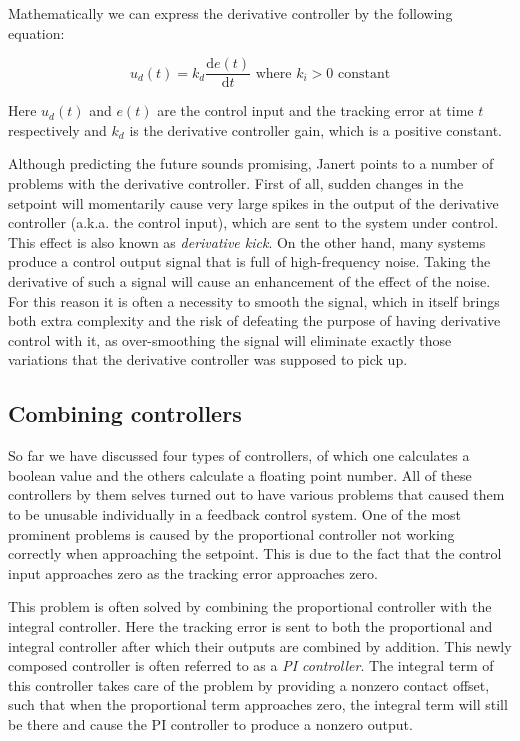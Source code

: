 Mathematically we can express the derivative controller by the following equation:

\begin{equation}\label{eq:derivative-control}
u_d(t) = k_d \frac{\mathrm{d} e(t)}{\mathrm{d} t} \text{\ \ \ \ where } k_i > 0 \text{ constant}
\end{equation}

Here $u_d(t)$ and $e(t)$ are the control input and the tracking error at time $t$ respectively and $k_d$ is the derivative controller gain, which is a positive constant.

Although predicting the future sounds promising, Janert \cite{janert2013-feedback} points to a number of problems with the derivative controller. First of all, sudden changes in the setpoint will momentarily cause very large spikes in the output of the derivative controller (a.k.a. the control input), which are sent to the system under control. This effect is also known as \textit{derivative kick}. On the other hand, many systems produce a control output signal that is full of high-frequency noise. Taking the derivative of such a signal will cause an enhancement of the effect of the noise. For this reason it is often a necessity to smooth the signal, which in itself brings both extra complexity and the risk of defeating the purpose of having derivative control with it, as over-smoothing the signal will eliminate exactly those variations that the derivative controller was supposed to pick up.

\subsection{Combining controllers}
\label{subsec:combining-controllers}
So far we have discussed four types of controllers, of which one calculates a boolean value and the others calculate a floating point number. All of these controllers by them selves turned out to have various problems that caused them to be unusable individually in a feedback control system. One of the most prominent problems is caused by the proportional controller not working correctly when approaching the setpoint. This is due to the fact that the control input approaches zero as the tracking error approaches zero.

This problem is often solved by combining the proportional controller with the integral controller. Here the tracking error is sent to both the proportional and integral controller after which their outputs are combined by addition. This newly composed controller is often referred to as a \textit{PI controller}. The integral term of this controller takes care of the problem by providing a nonzero contact offset, such that when the proportional term approaches zero, the integral term will still be there and cause the PI controller to produce a nonzero output.

